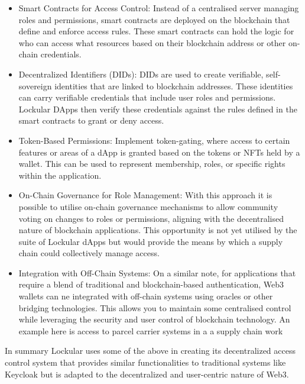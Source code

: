 \documentclass{tufte-handout}
\begin{document}
 \begin{itemize}
    \item Smart Contracts for Access Control: Instead of a centralised server managing roles and permissions, smart contracts are deployed on the blockchain that define and enforce
    access rules. These smart contracts can hold the logic for who can access what resources based on their blockchain address or other on-chain credentials.
    \item Decentralized Identifiers (DIDs): DIDs are used to create verifiable, self-sovereign identities that are linked to blockchain addresses. These identities can carry verifiable
    credentials that include user roles and permissions. Lockular DApps then verify these credentials against the rules defined in the smart contracts to grant or deny access.
    \item Token-Based Permissions: Implement token-gating, where access to certain features or areas of a dApp is granted based on the tokens or NFTs held by a wallet. This can be used
    to represent membership, roles, or specific rights within the application. 
    \item On-Chain Governance for Role Management: With this approach it is possible to utilise on-chain governance mechanisms to allow community voting on changes to roles or permissions,
    aligning with the decentralised nature of blockchain applications. This opportunity is not yet utilised by the suite of Lockular dApps but would provide the means by which a supply
    chain could collectively manage access.
    \item Integration with Off-Chain Systems: On a similar note, for applications that require a blend of traditional and blockchain-based authentication, Web3 wallets can ne integrated
    with off-chain systems using oracles or other bridging technologies. This allows you to maintain some centralised control while leveraging the security and user control of blockchain technology.
    An example here is access to parcel carrier systems in a a supply chain work
\end{itemize}
In summary Lockular uses some of the above in creating its decentralized access control system that provides similar functionalities to traditional systems like Keycloak but is adapted to the
decentralized and user-centric nature of Web3.
\end{document}

